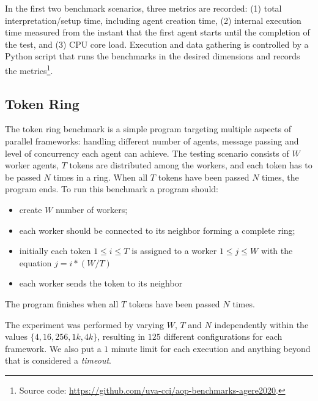 In the first two benchmark scenarios, three metrics are recorded: (1) total interpretation/setup time, including agent creation time, (2) internal execution time measured from the instant that the first agent starts until the completion of the test, and (3) CPU core load. Execution and data gathering is controlled by a Python script that runs the benchmarks in the desired dimensions and records the metrics\footnote{Source code: \url{https://github.com/uva-cci/aop-benchmarks-agere2020}.}. %

\subsection{Token Ring}
The token ring benchmark is a simple program targeting multiple aspects of parallel frameworks: handling different number of agents, message passing and level of concurrency each agent can achieve. The testing scenario consists of $W$ worker agents, $T$ tokens are distributed among the workers, and each token has to be passed $N$ times in a ring. When all $T$ tokens have been passed $N$ times, the program ends. To run this benchmark a program should:
\begin{itemize}
    \item create $W$ number of workers;
    \item each worker should be connected to its neighbor forming a complete ring;
    \item initially each token $1\leq i \leq T$  is assigned to a worker $1\leq j \leq W$ with the equation $j = i * (W/T)$
    \item each worker sends the token to its neighbor
\end{itemize}
The program finishes when all $T$ tokens have been passed $N$ times.

The experiment was performed by varying $W$, $T$ and $N$ independently within the values $\{4,16,256,1k,4k\}$, resulting in $125$ different configurations for each framework. We also put a $1$ minute limit for each execution and anything beyond that is considered a \textit{timeout}. 

